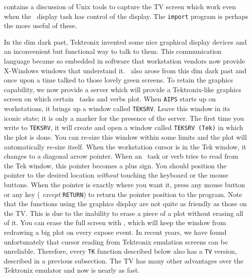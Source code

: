  contains a discussion of Unix tools to capture the TV
screen which work even when the \AIPS\ display task has control of the
display.  The {\tt import} program is perhaps the more useful of
these.


     In the dim dark past, Tektronix invented some nice graphical
display devices and an inconvenient but functional way to talk to
them.  This communication language became so embedded in software that
workstation vendors now provide X-Windows windows that understand it.
\AIPS\ also arose from this dim dark past and once upon a time talked
to those lovely green screens.  To retain the graphics capability, we
now provide a {\tt {}} server which will provide a
Tektronix-like graphics screen on which certain \AIPS\ tasks and verbs
plot.  When {\tt AIPS} starts up on workstations, it brings up a
window called {\tt TEKSRV}\@.  Leave this window in its iconic state;
it is only a marker for the presence of the server.  The first time
you write to {\tt TEKSRV}, it will create and open a window called
{\tt TEKSRV (Tek)} in which the plot is done.  You can re-size this
window within some limits and the plot will automatically re-size
itself. When the workstation cursor is in the Tek window, it changes
to a diagonal arrow pointer.  When an \AIPS\ task or verb tries to
read from the Tek window, this pointer becomes a plus sign.  You
should position the pointer to the desired location {\it without\/}
touching the keyboard or the mouse buttons.  When the pointer is
exactly where you want it, press any mouse button or any key ({\it
except\/} {\tt RETURN}) to return the pointer position to the program.
Note that the functions using the graphics display are not quite as
friendly as those on the TV\@.  This is due to the inability to erase
a piece of a plot without erasing all of it.  You can erase the full
screen with {\tt {}}, which will keep the window from
redrawing a big plot on every expose event.  In recent years, we have
found unfortunately that cursor reading from Tektronix emulation
screens can be unreliable.  Therefore, every {\tt TK} function
described below also has a {\tt TV} version, described in a previous
subsection.  The TV has many other advantages over the Tektronix
emulator and now is nearly as fast.


